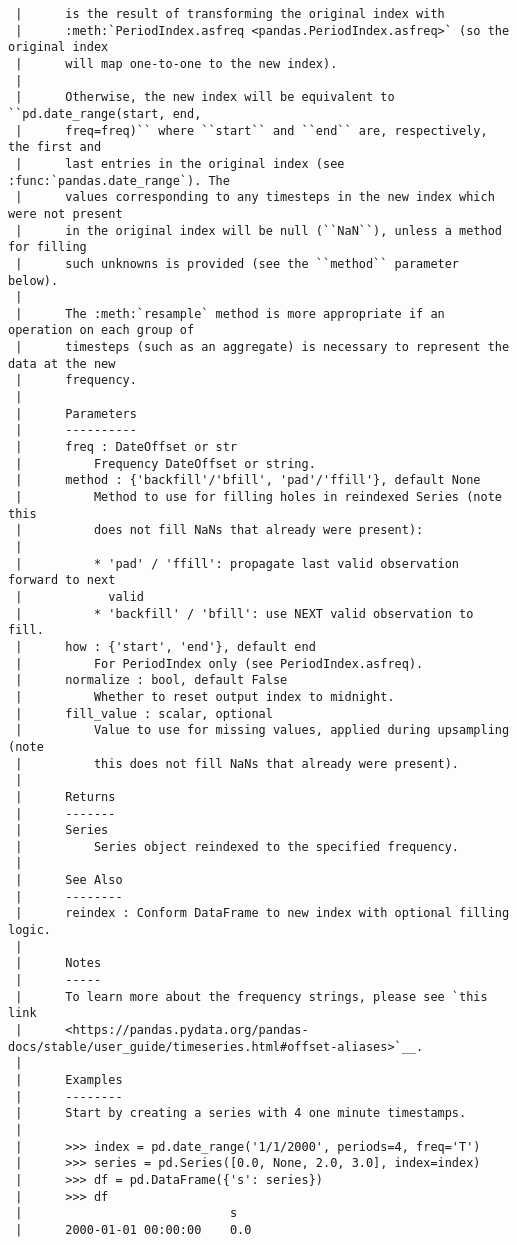 \documentclass[
  letterpaper,
  DIV=11,
  numbers=noendperiod]{scrreprt}
\begin{document}
\begin{verbatim}
 |      is the result of transforming the original index with
 |      :meth:`PeriodIndex.asfreq <pandas.PeriodIndex.asfreq>` (so the original index
 |      will map one-to-one to the new index).
 |      
 |      Otherwise, the new index will be equivalent to ``pd.date_range(start, end,
 |      freq=freq)`` where ``start`` and ``end`` are, respectively, the first and
 |      last entries in the original index (see :func:`pandas.date_range`). The
 |      values corresponding to any timesteps in the new index which were not present
 |      in the original index will be null (``NaN``), unless a method for filling
 |      such unknowns is provided (see the ``method`` parameter below).
 |      
 |      The :meth:`resample` method is more appropriate if an operation on each group of
 |      timesteps (such as an aggregate) is necessary to represent the data at the new
 |      frequency.
 |      
 |      Parameters
 |      ----------
 |      freq : DateOffset or str
 |          Frequency DateOffset or string.
 |      method : {'backfill'/'bfill', 'pad'/'ffill'}, default None
 |          Method to use for filling holes in reindexed Series (note this
 |          does not fill NaNs that already were present):
 |      
 |          * 'pad' / 'ffill': propagate last valid observation forward to next
 |            valid
 |          * 'backfill' / 'bfill': use NEXT valid observation to fill.
 |      how : {'start', 'end'}, default end
 |          For PeriodIndex only (see PeriodIndex.asfreq).
 |      normalize : bool, default False
 |          Whether to reset output index to midnight.
 |      fill_value : scalar, optional
 |          Value to use for missing values, applied during upsampling (note
 |          this does not fill NaNs that already were present).
 |      
 |      Returns
 |      -------
 |      Series
 |          Series object reindexed to the specified frequency.
 |      
 |      See Also
 |      --------
 |      reindex : Conform DataFrame to new index with optional filling logic.
 |      
 |      Notes
 |      -----
 |      To learn more about the frequency strings, please see `this link
 |      <https://pandas.pydata.org/pandas-docs/stable/user_guide/timeseries.html#offset-aliases>`__.
 |      
 |      Examples
 |      --------
 |      Start by creating a series with 4 one minute timestamps.
 |      
 |      >>> index = pd.date_range('1/1/2000', periods=4, freq='T')
 |      >>> series = pd.Series([0.0, None, 2.0, 3.0], index=index)
 |      >>> df = pd.DataFrame({'s': series})
 |      >>> df
 |                             s
 |      2000-01-01 00:00:00    0.0

\end{verbatim}
\end{document}
